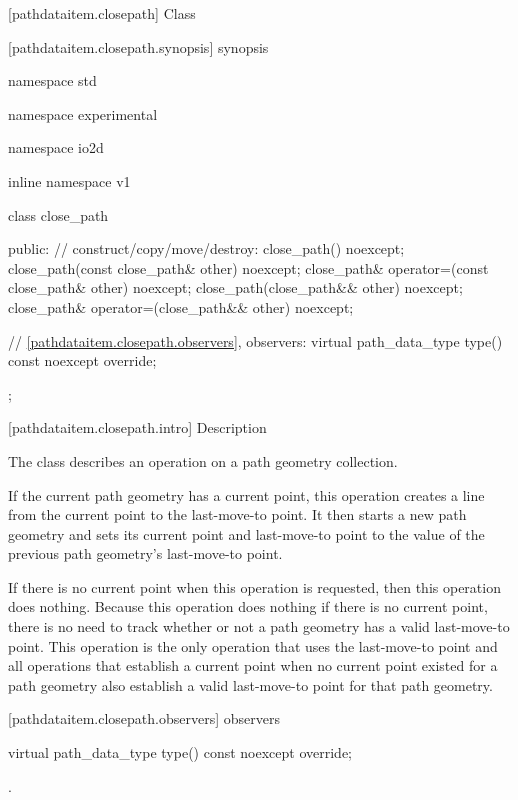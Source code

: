  [pathdataitem.closepath] {Class }

 [pathdataitem.closepath.synopsis] { synopsis}

\begin{codeblock}
namespace std { namespace experimental { namespace io2d { inline namespace v1 {
  class close_path {
  public:
    // construct/copy/move/destroy:
    close_path() noexcept;
    close_path(const close_path& other) noexcept;
    close_path& operator=(const close_path& other) noexcept;
    close_path(close_path&& other) noexcept;
    close_path& operator=(close_path&& other) noexcept;

    // \ref{pathdataitem.closepath.observers}, observers:
    virtual path_data_type type() const noexcept override;
  };
} } } }
\end{codeblock}

 [pathdataitem.closepath.intro] { Description}

\pnum
{}
The class  describes an operation on a path geometry collection.

\pnum
If the current path geometry has a current point, this operation creates a line from the current point to the last-move-to point. It then starts a new path geometry and sets its current point and last-move-to point to the value of the previous path geometry's last-move-to point.

\pnum
If there is no current point when this operation is requested, then this operation does nothing.
\enternote
Because this operation does nothing if there is no current point, there is no need to track whether or not a path geometry has a valid last-move-to point. This operation is the only operation that uses the last-move-to point and all operations that establish a current point when no current point existed for a path geometry also establish a valid last-move-to point for that path geometry.
\exitnote

 [pathdataitem.closepath.observers]{ observers}

\begin{itemdecl}
    virtual path_data_type type() const noexcept override;
\end{itemdecl}
\begin{itemdescr}
	\pnum
	\returns
	.

\end{itemdescr}

